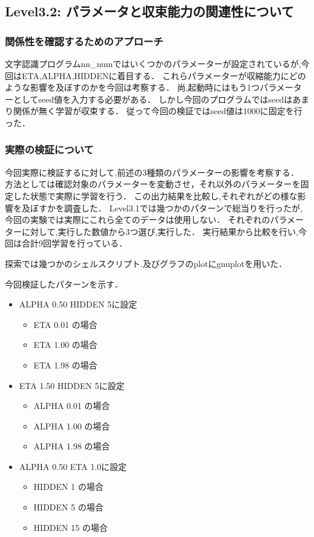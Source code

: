 \subsection{Level3.2: パラメータと収束能力の関連性について}
\subsubsection{関係性を確認するためのアプローチ}
文字認識プログラムnn\_numではいくつかのパラメーターが設定されているが,今回はETA,ALPHA,HIDDENに着目する．
これらパラメーターが収縮能力にどのような影響を及ぼすのかを今回は考察する．
尚,起動時にはもう1つパラメーターとしてseed値を入力する必要がある．
しかし今回のプログラムではseedはあまり関係が無く学習が収束する．
従って今回の検証ではseed値は1000に固定を行った．

\subsubsection{実際の検証について}
今回実際に検証するに対して,前述の3種類のパラメーターの影響を考察する．
方法としては確認対象のパラメーターを変動させ，それ以外のパラメーターを固定した状態で実際に学習を行う．
この出力結果を比較し,それぞれがどの様な影響を及ぼすかを調査した．
Level3.1では幾つかのパターンで総当りを行ったが,今回の実験では実際にこれら全てのデータは使用しない．
それぞれのパラメーターに対して,実行した数値から3つ選び,実行した．
実行結果から比較を行い,今回は合計9回学習を行っている．

探索では幾つかのシェルスクリプト.及びグラフのplotにgnuplotを用いた．

今回検証したパターンを示す．


\begin{itemize}
    \item ALPHA 0.50 HIDDEN 5に設定
        \begin{itemize}
        \item ETA 0.01 の場合
        \item ETA 1.00 の場合
        \item ETA 1.98 の場合
        \end{itemize}
    \item ETA 1.50 HIDDEN 5に設定
        \begin{itemize}
            \item ALPHA 0.01 の場合
            \item ALPHA 1.00 の場合
            \item ALPHA 1.98 の場合
        \end{itemize}
    \item ALPHA 0.50 ETA 1.0に設定
        \begin{itemize}
            \item HIDDEN 1 の場合
            \item HIDDEN 5 の場合
            \item HIDDEN 15 の場合
        \end{itemize}

\end{itemize}

